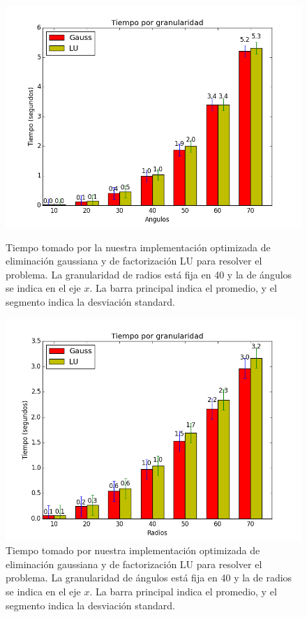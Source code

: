 \begin{figure}[H]
\centering
\begin{minipage}{0.48\textwidth}
  \centering
    \includegraphics[width=1\textwidth]{imgs/tiempos_opt_radios.png}
  \caption{\footnotesize{Tiempo tomado por la nuestra implementación optimizada de eliminación gaussiana y de factorización LU para resolver el problema. La granularidad de radios está fija en 40 y la de ángulos se indica en el eje $x$. La barra principal indica el promedio, y el segmento indica la desviación standard.}}
  \label{fig:tiempoopt1}
\end{minipage}%
\hspace{0.03\textwidth}
\begin{minipage}{0.48\textwidth}   
  \centering
    \includegraphics[width=1\textwidth]{imgs/tiempos_opt_angulos.png} 
  \caption{\footnotesize{Tiempo tomado por nuestra implementación optimizada de eliminación gaussiana y de factorización LU para resolver el problema. La granularidad de ángulos está fija en 40 y la de radios se indica en el eje $x$. La barra principal indica el promedio, y el segmento indica la desviación standard.}}
  \label{fig:tiempoopt2}
\end{minipage}
\end{figure}



